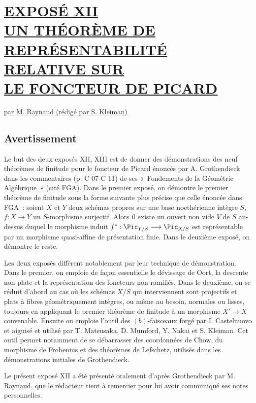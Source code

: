 
\section*{\underline{EXPOSÉ XII}\\[3pt] \underline{\underline{UN THÉORÈME DE REPRÉSENTABILITÉ RELATIVE SUR}}\\[3pt] \underline{\underline{LE FONCTEUR DE PICARD}}}
\begin{center}
\underline{par M. Raynaud (rédigé par S. Kleiman)}
\end{center}

\subsection*{Avertissement}

Le but des deux exposés XII, XIII est de donner des démonstrations des neuf théorèmes de finitude pour le foncteur de Picard énoncés par A. Grothendieck dans les commentaires (p. C 07-C 11) de ses «~Fondements de la Géométrie Algébrique~» (cité FGA). Dans le premier exposé, on démontre le premier théorème de finitude sous la forme suivante plus précise que celle énoncée dans FGA~: soient \(X\) et \(Y\) deux schémas propres sur une base noethérienne intègre \(S\), \(f:X\longrightarrow Y\) un \(S\)-morphisme surjectif. Alors il existe un ouvert non vide \(V\) de \(S\) au-dessus duquel le morphisme induit \(f^*:\Pic_{Y/S}\longrightarrow \Pic_{X/S}\) est représentable par un morphisme quasi-affine de présentation finie. Dans le deuxième exposé, on démontre le reste.

Les deux exposés diffèrent notablement par leur technique de démonstration. Dans le premier, on emploie de façon essentielle le dévissage de Oort, la descente non plate et la représentation des foncteurs non-ramifiés. Dans le deuxième, on se réduit d'abord au cas où les schémas \(X/S\) qui interviennent sont projectifs et plats à fibres géométriquement intègres, ou même au besoin, normales ou lisses, toujours en appliquant le premier théorème de finitude à un morphisme \(X'\to X\) convenable. Ensuite on emploie l'outil des \((b)\)-faisceaux forgé par I. Castelnuovo et aiguisé et utilisé par T. Matsusaka, D. Mumford, Y. Nakai et S. Kleiman. Cet outil permet notamment de se débarrasser des coordonnées de Chow, du morphisme de Frobenius et des théorèmes de Lefschetz, utilisés dans les démonstrations initiales de Grothendieck.

Le présent exposé XII a été présenté oralement d'après Grothendieck par M. Raynaud, que le rédacteur tient à remercier pour lui avoir communiqué ses notes personnelles.

